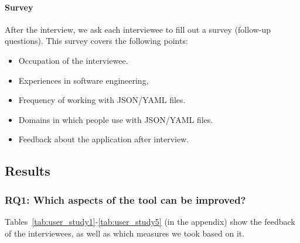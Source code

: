 \paragraph{Survey}
After the interview, we ask each interviewee to fill out a survey (follow-up questions).
This survey covers the following points:
\begin{itemize}
    \item Occupation of the interviewee.
    \item Experiences in software engineering,
    \item Frequency of working with JSON/YAML files.
    \item Domains in which people use with JSON/YAML files.
    \item Feedback about the application after interview.
\end{itemize}

\subsection{Results}\label{subsec:results}


\subsubsection{\textbf{RQ1:} Which aspects of the tool can be improved?} %
Tables~\ref{tab:user_study1}-\ref{tab:user_study5} (in the appendix) show the feedback of the interviewees, as well as which measures we took based on it.



